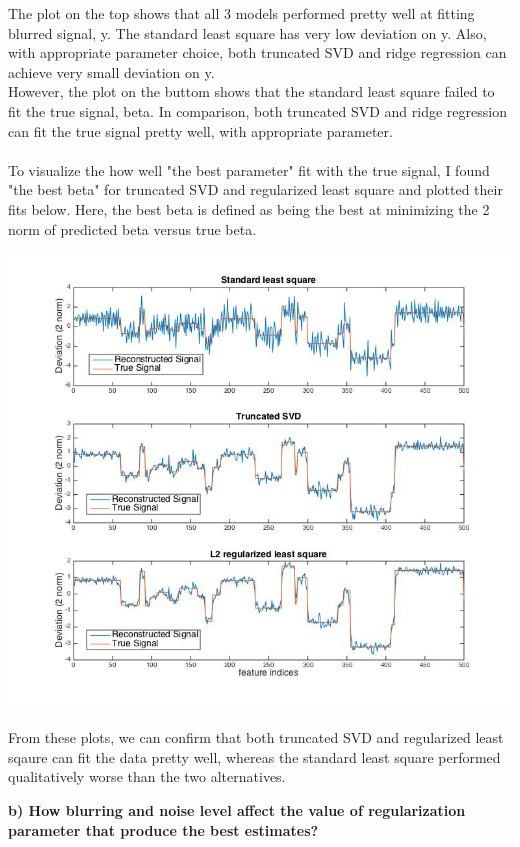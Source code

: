 \documentclass[paper=a4, fontsize=11pt]{scrartcl} %
\numberwithin{equation}{section} %
\numberwithin{figure}{section} %
\numberwithin{table}{section} %
\begin{document}
The plot on the top shows that all 3 models performed pretty well at fitting blurred signal, y. The standard least square has very low deviation on y. Also, with appropriate parameter choice, both truncated SVD and ridge regression can achieve very small deviation on y. \\

However, the plot on the buttom shows that the standard least square failed to fit the true signal, beta. In comparison, both truncated SVD and ridge regression can fit the true signal pretty well, with appropriate parameter. \\\\

To visualize the how well "the best parameter" fit with the true signal, I found "the best beta" for truncated SVD and regularized least square and plotted their fits below. Here, the best beta is defined as being the best at minimizing the 2 norm of predicted beta versus true beta. 

\includegraphics[scale=.5]{2a_compareBetas.jpg}

From these plots, we can confirm that both truncated SVD and regularized least sqaure can fit the data pretty well, whereas the standard least square performed qualitatively worse than the two alternatives. 

\newpage
\textbf{b) How blurring and noise level affect the value of regularization parameter that produce the best estimates?}\\
\end{document}
